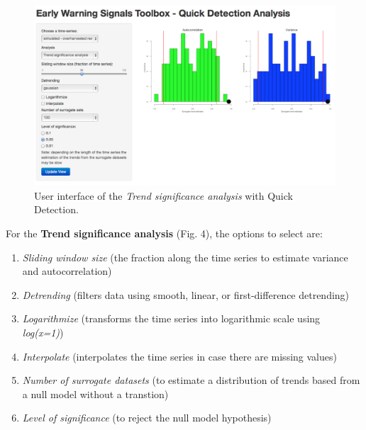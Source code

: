 \documentclass[12pt,a4paper,final]{article}
\begin{document}
\begin{doublespacing}
\begin{figure}[ht]
\begin{center}
\includegraphics[scale=0.4]{demo_significance2.png}
\caption{User interface of the \textit{Trend significance analysis} with Quick Detection.}
\end{center}
\end{figure}

\newpage
For the \textbf{Trend significance analysis} (Fig. 4), the options to select are:
\begin{enumerate}
\item \textit{Sliding window size} (the fraction along the time series to estimate variance and autocorrelation)
\item  \textit{Detrending} (filters data using smooth, linear, or first-difference detrending)
\item \textit{Logarithmize} (transforms the time series into logarithmic scale using \textit{log(x=1)})
\item \textit{Interpolate} (interpolates the time series in case there are missing values)
\item \textit{Number of surrogate datasets} (to estimate a distribution of trends based from a null model without a transtion)
\item \textit{Level of significance} (to reject the null model hypothesis)
\end{enumerate}


\end{doublespacing}
\end{document}
